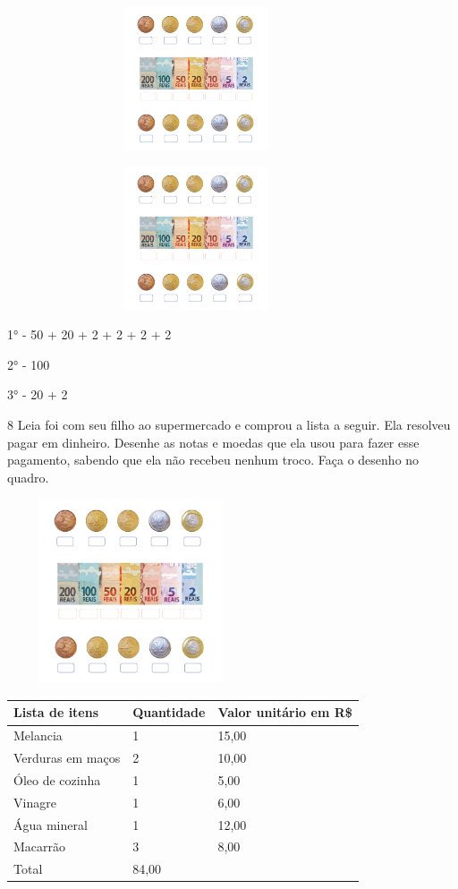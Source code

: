 \includegraphics[width=4.40625in,height=1.66152in]{media/image72.png}

\includegraphics[width=4.40625in,height=1.66152in]{media/image72.png}

1° - 50 + 20 + 2 + 2 + 2 + 2

2° - 100

3° - 20 + 2


\num{8} Leia foi com seu filho ao supermercado e comprou a lista a seguir. Ela
resolveu pagar em dinheiro. Desenhe as notas e moedas que ela usou para
fazer esse pagamento, sabendo que ela não recebeu nenhum troco. Faça o
desenho no quadro.


\includegraphics[width=2.86111in,height=2.14583in]{media/image74.png}

\begin{longtable}[]{@{}lll@{}}
\toprule
Lista de itens & Quantidade & Valor unitário em R\$\tabularnewline
\midrule
\endhead
Melancia & 1 & 15,00\tabularnewline
Verduras em maços & 2 & 10,00\tabularnewline
Óleo de cozinha & 1 & 5,00\tabularnewline
Vinagre & 1 & 6,00\tabularnewline
Água mineral & 1 & 12,00\tabularnewline
Macarrão & 3 & 8,00\tabularnewline
Total & 84,00\tabularnewline
\bottomrule
\end{longtable}

